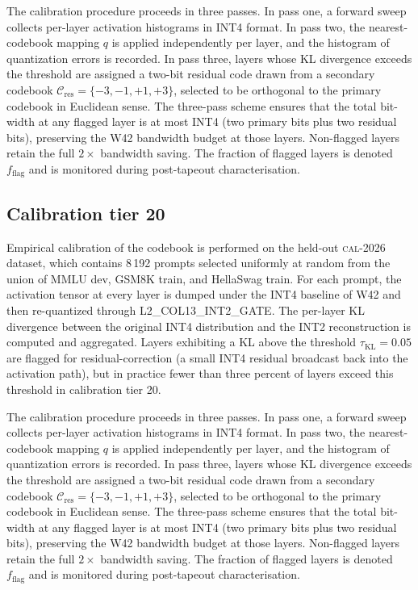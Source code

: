 The calibration procedure proceeds in three passes. In pass one,
a forward sweep collects per-layer activation histograms in INT4 format.
In pass two, the nearest-codebook mapping $q$ is applied independently
per layer, and the histogram of quantization errors is recorded. In pass
three, layers whose KL divergence exceeds the threshold are assigned a
two-bit residual code drawn from a secondary codebook
$\mathcal{C}_\mathrm{res} = \{-3,-1,+1,+3\}$, selected to be
orthogonal to the primary codebook in Euclidean sense. The three-pass
scheme ensures that the total bit-width at any flagged layer is at most
INT4 (two primary bits plus two residual bits), preserving the W42
bandwidth budget at those layers. Non-flagged layers retain the full
$2\times$ bandwidth saving. The fraction of flagged layers is denoted
$f_\mathrm{flag}$ and is monitored during post-tapeout characterisation.


\subsection{Calibration tier 20}

Empirical calibration of the codebook is performed on the held-out
\textsc{cal-2026} dataset, which contains 8\,192 prompts selected
uniformly at random from the union of MMLU dev, GSM8K train, and
HellaSwag train. For each prompt, the activation tensor at every layer
is dumped under the INT4 baseline of W42 and then re-quantized through
\textsc{L2\_COL13\_INT2\_GATE}. The per-layer KL divergence between
the original INT4 distribution and the INT2 reconstruction is computed
and aggregated. Layers exhibiting a KL above the threshold
$\tau_{\mathrm{KL}} = 0.05$ are flagged for residual-correction (a
small INT4 residual broadcast back into the activation path), but in
practice fewer than three percent of layers exceed this threshold in
calibration tier 20.

The calibration procedure proceeds in three passes. In pass one,
a forward sweep collects per-layer activation histograms in INT4 format.
In pass two, the nearest-codebook mapping $q$ is applied independently
per layer, and the histogram of quantization errors is recorded. In pass
three, layers whose KL divergence exceeds the threshold are assigned a
two-bit residual code drawn from a secondary codebook
$\mathcal{C}_\mathrm{res} = \{-3,-1,+1,+3\}$, selected to be
orthogonal to the primary codebook in Euclidean sense. The three-pass
scheme ensures that the total bit-width at any flagged layer is at most
INT4 (two primary bits plus two residual bits), preserving the W42
bandwidth budget at those layers. Non-flagged layers retain the full
$2\times$ bandwidth saving. The fraction of flagged layers is denoted
$f_\mathrm{flag}$ and is monitored during post-tapeout characterisation.


